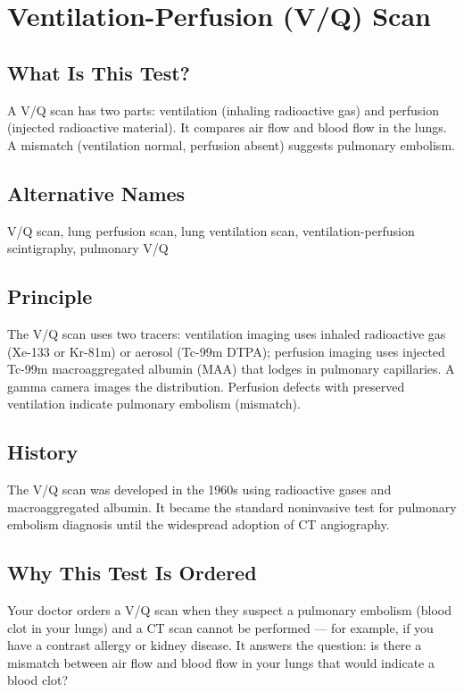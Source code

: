 \chapter{Ventilation-Perfusion (V/Q) Scan}

\section*{What Is This Test?}
A V/Q scan has two parts: ventilation (inhaling radioactive gas) and perfusion (injected radioactive material). It compares air flow and blood flow in the lungs. A mismatch (ventilation normal, perfusion absent) suggests pulmonary embolism.

\section*{Alternative Names}
V/Q scan, lung perfusion scan, lung ventilation scan, ventilation-perfusion scintigraphy, pulmonary V/Q


\section*{Principle}
The V/Q scan uses two tracers: ventilation imaging uses inhaled radioactive gas (Xe-133 or Kr-81m) or aerosol (Tc-99m DTPA); perfusion imaging uses injected Tc-99m macroaggregated albumin (MAA) that lodges in pulmonary capillaries. A gamma camera images the distribution. Perfusion defects with preserved ventilation indicate pulmonary embolism (mismatch).

\section*{History}
The V/Q scan was developed in the 1960s using radioactive gases and macroaggregated albumin. It became the standard noninvasive test for pulmonary embolism diagnosis until the widespread adoption of CT angiography.

\section*{Why This Test Is Ordered}
Your doctor orders a V/Q scan when they suspect a pulmonary embolism (blood clot in your lungs) and a CT scan cannot be performed --- for example, if you have a contrast allergy or kidney disease. It answers the question: is there a mismatch between air flow and blood flow in your lungs that would indicate a blood clot?

